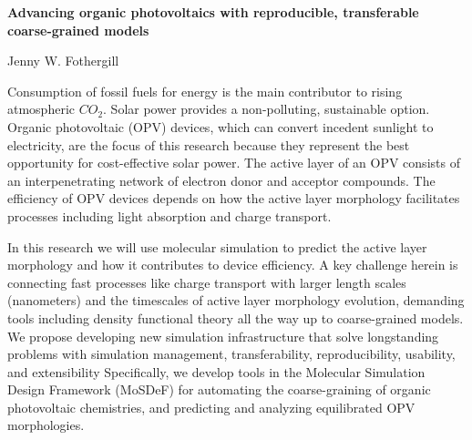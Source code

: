 \documentclass{article}
\begin{document}
\begin{center}
    \large{\textbf{Advancing organic photovoltaics with reproducible, transferable coarse-grained models}}
\end{center}
\begin{center}
    Jenny W. Fothergill
\end{center}

Consumption of fossil fuels for energy is the main contributor to rising atmospheric $CO_{2}$. 
Solar power provides a non-polluting, sustainable option.
Organic photovoltaic (OPV) devices, which can convert incedent sunlight to electricity, are the focus of this research because they represent the best opportunity for cost-effective solar power.
The active layer of an OPV consists of an interpenetrating network of electron donor and acceptor compounds.
The efficiency of OPV devices depends on how the active layer morphology facilitates processes including light absorption and charge transport.

In this research we will use molecular simulation to predict the active layer morphology and how it contributes to device efficiency.
A key challenge herein is connecting fast processes like charge transport with larger length scales (nanometers) and the timescales of active layer morphology evolution, demanding tools including density functional theory all the way up to coarse-grained models.
We propose developing new simulation infrastructure that solve longstanding problems with simulation management, transferability, reproducibility, usability, and extensibility
Specifically, we develop tools in the Molecular Simulation Design Framework (MoSDeF) for automating the coarse-graining of organic photovoltaic chemistries, and predicting and analyzing equilibrated OPV morphologies.
\end{document}
